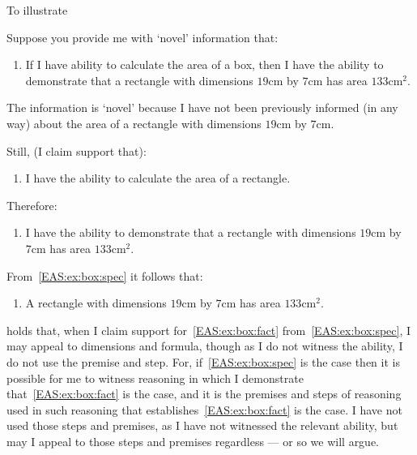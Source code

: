 \begin{note}
  To illustrate \EAS{}

  \begin{illustration}\label{ill:rectangle:ability}
    Suppose you provide me with `novel' information that:
    \begin{enumerate}[label=\emph{A}\arabic*., ref=(\emph{A}\arabic*), series=EAS_counter]
    \item\label{EAS:ex:box:if} If I have ability to calculate the area of a box, then I have the ability to demonstrate that a rectangle with dimensions \(19\text{cm}\) by \(7\text{cm}\) has area \(133\text{cm}^{2}\).
    \end{enumerate}
    The information is `novel' because I have not been previously informed (in any way) about the area of a rectangle with dimensions \(19\text{cm}\) by \(7\text{cm}\).

    Still, (I claim support that):
    \begin{enumerate}[label=\emph{A}\arabic*., ref=(\emph{A}\arabic*), resume*=EAS_counter]
    \item\label{EAS:ex:box:gen} I have the ability to calculate the area of a rectangle.
    \end{enumerate}
    Therefore:
    \begin{enumerate}[label=\emph{A}\arabic*., ref=(\emph{A}\arabic*), resume*=EAS_counter]
    \item\label{EAS:ex:box:spec} I have the ability to demonstrate that a rectangle with dimensions \(19\text{cm}\) by \(7\text{cm}\) has area \(133\text{cm}^{2}\).
    \end{enumerate}
    From~\ref{EAS:ex:box:spec} it follows that:
    \begin{enumerate}[label=\emph{A}\arabic*., ref=(\emph{A}\arabic*), resume*=EAS_counter]
    \item\label{EAS:ex:box:fact} A rectangle with dimensions \(19\text{cm}\) by \(7\text{cm}\) has area \(133\text{cm}^{2}\).
    \end{enumerate}
  \end{illustration}
  \EAS{} holds that, when I claim support for~\ref{EAS:ex:box:fact} from~\ref{EAS:ex:box:spec}, I may appeal to dimensions and formula, though as I do not witness the ability, I do not use the premise and step.
  For, if~\ref{EAS:ex:box:spec} is the case then it is possible for me to witness reasoning in which I demonstrate that~\ref{EAS:ex:box:fact} is the case, and it is the premises and steps of reasoning used in such reasoning that establishes~\ref{EAS:ex:box:fact} is the case.
  I have not used those steps and premises, as I have not witnessed the relevant ability, but may I appeal to those steps and premises regardless --- or so we will argue.
\end{note}

